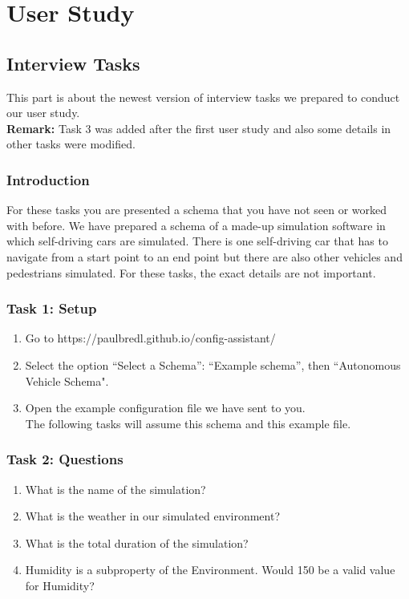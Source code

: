 
\appendices\section{User Study}\label{sec:user-study}  %
\subsection{Interview Tasks}\label{subsec:tasks}
This part is about the newest version of interview tasks we prepared to conduct our user study.\\
\textbf{Remark:} Task 3 was added after the first user study and also some details in other tasks were modified.
\subsubsection{Introduction}
For these tasks you are presented a schema that you have not seen or worked with before.
We have prepared a schema of a made-up simulation software in which self-driving cars are simulated.
There is one self-driving car that has to navigate from a start point to an end point but there are also other vehicles and pedestrians simulated.
For these tasks, the exact details are not important.

\subsubsection{Task 1: Setup}
\begin{enumerate}
    \item Go to https://paulbredl.github.io/config-assistant/
    \item Select the option ``Select a Schema'': ``Example schema'', then ``Autonomous Vehicle Schema".
    \item Open the example configuration file we have sent to you. \\
          The following tasks will assume this schema and this example file.
\end{enumerate}

\subsubsection{Task 2: Questions}
\begin{enumerate}
    \item What is the name of the simulation?
    \item What is the weather in our simulated environment?
    \item What is the total duration of the simulation?
    \item Humidity is a subproperty of the Environment.
    Would 150 be a valid value for Humidity?
\end{enumerate}

